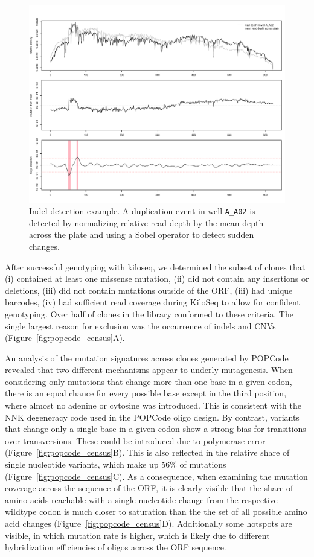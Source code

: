 \begin{figure}[h!]
	\centering
	\includegraphics[width=\textwidth]{img/border_detect.pdf}
	\caption{Indel detection example. A duplication event in well \texttt{A\_A02} is detected by normalizing relative read depth by the mean depth across the plate and using a Sobel operator to detect sudden changes.}
	\label{fig:border_detect}
\end{figure}


After successful genotyping with kiloseq, we determined the subset of clones that (i) contained at least one missense mutation, (ii) did not contain any insertions or deletions, (iii) did not contain mutations outside of the ORF, (iii) had unique barcodes, (iv) had sufficient read coverage during KiloSeq to allow for confident genotyping.
Over half of clones in the library conformed to these criteria. The single largest reason for exclusion was the occurrence of indels and CNVs (Figure~\ref{fig:popcode_census}A). 

An analysis of the mutation signatures across clones generated by POPCode revealed that two different mechanisms appear to underly mutagenesis. When considering only mutations that change more than one base in a given codon, there is an equal chance for every possible base except in the third position, where almost no adenine or cytosine was introduced. This is consistent with the NNK degeneracy code used in the POPCode oligo design. By contrast, variants that change only a single base in a given codon show a strong bias for transitions over transversions. These could be introduced due to polymerase error (Figure~\ref{fig:popcode_census}B). This is also reflected in the relative share of single nucleotide variants, which make up 56\% of mutations (Figure~\ref{fig:popcode_census}C). As a consequence, when examining the mutation coverage across the sequence of the ORF, it is clearly visible that the share of amino acids reachable with a single nucleotide change from the respective wildtype codon is much closer to saturation than the the set of all possible amino acid changes (Figure~\ref{fig:popcode_census}D). Additionally some hotspots are visible, in which mutation rate is higher, which is likely due to different hybridization efficiencies of oligos across the ORF sequence.

